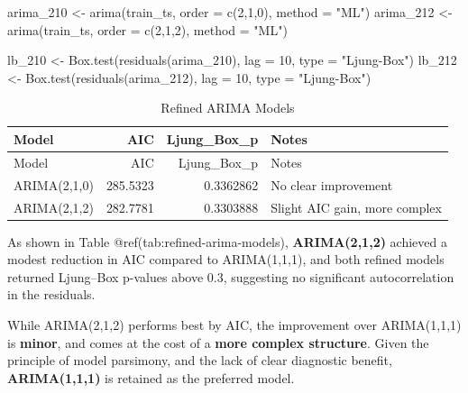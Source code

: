 \documentclass[
  11pt,
]{article}
\newenvironment{Shaded}{\begin{snugshade}}{\end{snugshade}}
\newcommand{\AttributeTok}[1]{\textcolor[rgb]{0.40,0.45,0.13}{#1}}
\newcommand{\DecValTok}[1]{\textcolor[rgb]{0.68,0.00,0.00}{#1}}
\newcommand{\FunctionTok}[1]{\textcolor[rgb]{0.28,0.35,0.67}{#1}}
\newcommand{\NormalTok}[1]{\textcolor[rgb]{0.00,0.23,0.31}{#1}}
\newcommand{\OtherTok}[1]{\textcolor[rgb]{0.00,0.23,0.31}{#1}}
\newcommand{\StringTok}[1]{\textcolor[rgb]{0.13,0.47,0.30}{#1}}
\begin{document}
\begin{Shaded}
\begin{Highlighting}[]
\NormalTok{arima\_210 }\OtherTok{\textless{}{-}} \FunctionTok{arima}\NormalTok{(train\_ts, }\AttributeTok{order =} \FunctionTok{c}\NormalTok{(}\DecValTok{2}\NormalTok{,}\DecValTok{1}\NormalTok{,}\DecValTok{0}\NormalTok{), }\AttributeTok{method =} \StringTok{"ML"}\NormalTok{)}
\NormalTok{arima\_212 }\OtherTok{\textless{}{-}} \FunctionTok{arima}\NormalTok{(train\_ts, }\AttributeTok{order =} \FunctionTok{c}\NormalTok{(}\DecValTok{2}\NormalTok{,}\DecValTok{1}\NormalTok{,}\DecValTok{2}\NormalTok{), }\AttributeTok{method =} \StringTok{"ML"}\NormalTok{)}

\NormalTok{lb\_210 }\OtherTok{\textless{}{-}} \FunctionTok{Box.test}\NormalTok{(}\FunctionTok{residuals}\NormalTok{(arima\_210), }\AttributeTok{lag =} \DecValTok{10}\NormalTok{, }\AttributeTok{type =} \StringTok{"Ljung{-}Box"}\NormalTok{)}
\NormalTok{lb\_212 }\OtherTok{\textless{}{-}} \FunctionTok{Box.test}\NormalTok{(}\FunctionTok{residuals}\NormalTok{(arima\_212), }\AttributeTok{lag =} \DecValTok{10}\NormalTok{, }\AttributeTok{type =} \StringTok{"Ljung{-}Box"}\NormalTok{)}
\end{Highlighting}
\end{Shaded}

\begin{longtable}[]{@{}lrrl@{}}
\caption{Refined ARIMA Models}\tabularnewline
\toprule\noalign{}
Model & AIC & Ljung\_Box\_p & Notes \\
\midrule\noalign{}
\endfirsthead
\toprule\noalign{}
Model & AIC & Ljung\_Box\_p & Notes \\
\midrule\noalign{}
\endhead
\bottomrule\noalign{}
\endlastfoot
ARIMA(2,1,0) & 285.5323 & 0.3362862 & No clear improvement \\
ARIMA(2,1,2) & 282.7781 & 0.3303888 & Slight AIC gain, more complex \\
\end{longtable}

As shown in Table @ref(tab:refined-arima-models), \textbf{ARIMA(2,1,2)}
achieved a modest reduction in AIC compared to ARIMA(1,1,1), and both
refined models returned Ljung--Box p-values above 0.3, suggesting no
significant autocorrelation in the residuals.

While ARIMA(2,1,2) performs best by AIC, the improvement over
ARIMA(1,1,1) is \textbf{minor}, and comes at the cost of a \textbf{more
complex structure}. Given the principle of model parsimony, and the lack
of clear diagnostic benefit, \textbf{ARIMA(1,1,1)} is retained as the
preferred model.
\end{document}

